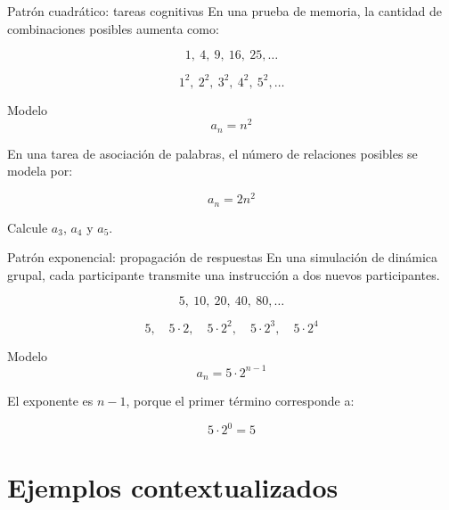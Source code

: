 \documentclass[aspectratio=169]{beamer}
\begin{document}
	
	\begin{frame}{Patrón cuadrático: tareas cognitivas}
		En una prueba de memoria, la cantidad de combinaciones posibles aumenta como:
		
		\[
		1,\ 4,\ 9,\ 16,\ 25,\ldots
		\]
		
		\pause
		
		\[
		1^2,\ 2^2,\ 3^2,\ 4^2,\ 5^2,\ldots
		\]
		
		\pause
		
		\begin{block}{Modelo}
			\[
			a_n=n^2
			\]
		\end{block}
		
		\pause
		
		\begin{actividad}
			En una tarea de asociación de palabras, el número de relaciones posibles se modela por:
			
			\[
			a_n=2n^2
			\]
			
			Calcule \(a_3\), \(a_4\) y \(a_5\).
		\end{actividad}
	\end{frame}
	
	
	\begin{frame}{Patrón exponencial: propagación de respuestas}
		En una simulación de dinámica grupal, cada participante transmite una instrucción a dos nuevos participantes.
		
		\[
		5,\ 10,\ 20,\ 40,\ 80,\ldots
		\]
		
		\pause
		
		\[
		5,\quad 5\cdot2,\quad 5\cdot2^2,\quad 5\cdot2^3,\quad 5\cdot2^4
		\]
		
		\pause
		
		\begin{block}{Modelo}
			\[
			a_n=5\cdot2^{n-1}
			\]
		\end{block}
		
		\pause
		
		\begin{alerta}
			El exponente es \(n-1\), porque el primer término corresponde a:
			
			\[
			5\cdot2^0=5
			\]
		\end{alerta}
	\end{frame}
	
	\section{Ejemplos contextualizados}
	
\end{document}
